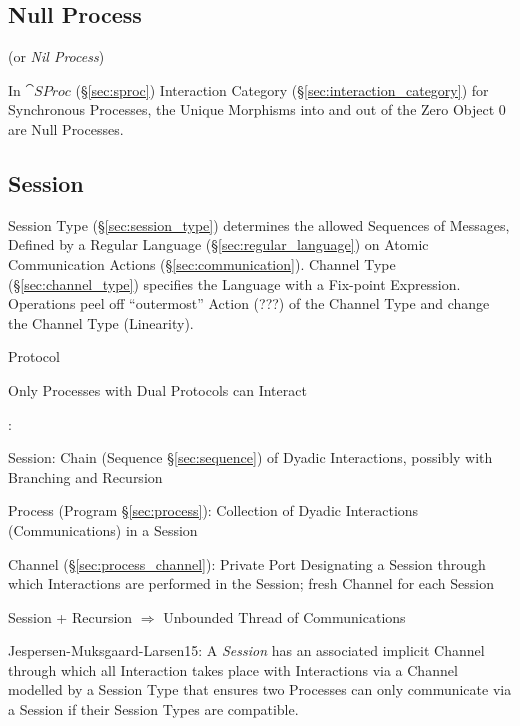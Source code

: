 \subsection{Null Process}\label{sec:null_process}

(or \emph{Nil Process})

In $\cat{SProc}$ (\S\ref{sec:sproc}) Interaction Category
(\S\ref{sec:interaction_category}) for Synchronous Processes, the
Unique Morphisms into and out of the Zero Object $0$ are Null
Processes.



\subsection{Session}\label{sec:session}

Session Type (\S\ref{sec:session_type}) determines the allowed
Sequences of Messages, Defined by a Regular Language
(\S\ref{sec:regular_language}) on Atomic Communication Actions
(\S\ref{sec:communication}). Channel Type (\S\ref{sec:channel_type})
specifies the Language with a Fix-point Expression. Operations peel
off ``outermost'' Action (???) of the Channel Type and change the
Channel Type (Linearity). \cite{neubauer-thiemann04}

Protocol

Only Processes with Dual Protocols can Interact

\cite{honda-vasconcelos-kubo98}:

Session: Chain (Sequence \S\ref{sec:sequence}) of Dyadic Interactions,
possibly with Branching and Recursion

Process (Program \S\ref{sec:process}): Collection of Dyadic
Interactions (Communications) in a Session

Channel (\S\ref{sec:process_channel}): Private Port Designating a
Session through which Interactions are performed in the Session; fresh
Channel for each Session

Session + Recursion $\Rightarrow$ Unbounded Thread of Communications
\cite{honda-vasconcelos-kubo98}

Jespersen-Muksgaard-Larsen15: A \emph{Session} has an associated
implicit Channel through which all Interaction takes place with
Interactions via a Channel modelled by a Session Type that ensures two
Processes can only communicate via a Session if their Session Types
are compatible.

